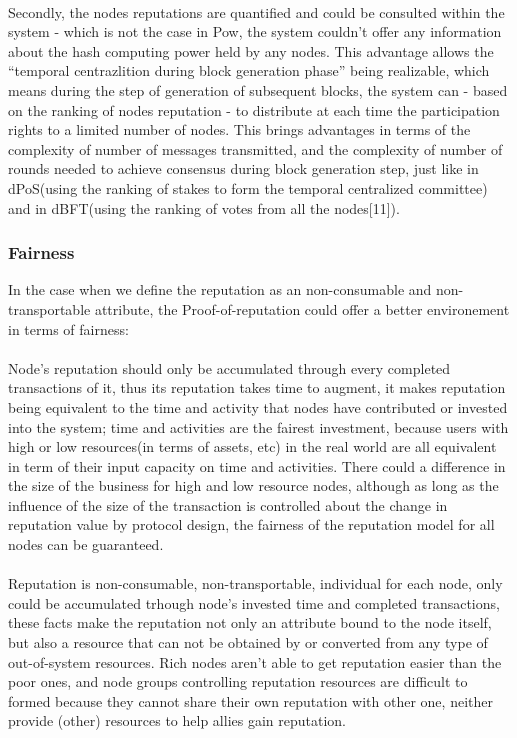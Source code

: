 \documentclass[]{article}
\begin{document}
\begin{CJK*}{UTF8}{gbsn}
\paragraph{} 
Secondly, the nodes reputations are quantified and could be consulted within the system - which is not the case in Pow, the system couldn't offer any information about the hash computing power held by any nodes. This advantage allows the ``temporal centrazlition during block generation phase'' being realizable, which means during the step of generation of subsequent blocks, the system can - based on the ranking of nodes reputation - to distribute at each time the participation rights to a limited number of nodes. This brings advantages in terms of the complexity of number of messages transmitted, and the complexity of number of rounds needed to achieve consensus during block generation step, just like in dPoS(using the ranking of stakes to form the temporal centralized committee) and in dBFT(using the ranking of votes from all the nodes[11]). 
\subsubsection*{Fairness}
In the case when we define the reputation as an non-consumable and non-transportable attribute, the Proof-of-reputation could offer a better environement in terms of fairness: 
\paragraph{} Node's reputation should only be accumulated through every completed transactions of it, thus its reputation takes time to augment, it makes reputation being equivalent to the time and activity that nodes have contributed or invested into the system; time and activities are the fairest investment, because users with high or low resources(in terms of assets, etc) in the real world are all equivalent in term of their input capacity on time and activities. There could a difference in the size of the business for high and low resource nodes, although as long as the influence of the size of the transaction is controlled about the change in reputation value by protocol design, the fairness of the reputation model for all nodes can be guaranteed.
\paragraph{} Reputation is non-consumable, non-transportable, individual for each node, only could be accumulated trhough node's invested time and completed transactions, these facts make the reputation not only an attribute bound to the node itself, but also a resource that can not be obtained by or converted from any type of out-of-system resources. Rich nodes aren't able to get reputation easier than the poor ones, and node groups controlling reputation resources are difficult to formed because they cannot share their own reputation with other one, neither provide (other) resources to help allies gain reputation. 

\end{CJK*}
\end{document}
